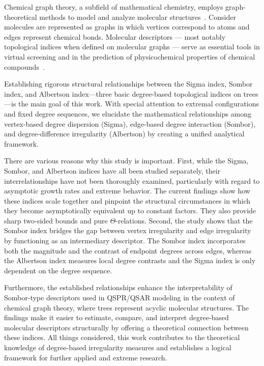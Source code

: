 \documentclass[12pt, a4paper]{article}
\begin{document}
Chemical graph theory, a subfield of mathematical chemistry, employs graph-theoretical methods to model and analyze molecular structures~\cite{Dac2026KCV}. Consider molecules are represented as graphs in which vertices correspond to atoms and edges represent chemical bonds.  Molecular descriptors --- most notably topological indices when defined on molecular graphs --- serve as essential tools in virtual screening and in the prediction of physicochemical properties of chemical compounds~\cite{Basak2024,Desmecht2024}.


Establishing rigorous structural relationships between the Sigma index, Sombor index, and Albertson index—three basic degree-based topological indices on trees—is the main goal of this work. With special attention to extremal configurations and fixed degree sequences, we elucidate the mathematical relationships among vertex-based degree dispersion (Sigma), edge-based degree interaction (Sombor), and degree-difference irregularity (Albertson) by creating a unified analytical framework.

There are various reasons why this study is important. First, while the Sigma, Sombor, and Albertson indices have all been studied separately, their interrelationships have not been thoroughly examined, particularly with regard to asymptotic growth rates and extreme behavior. The current findings show how these indices scale together and pinpoint the structural circumstances in which they become asymptotically equivalent up to constant factors. They also provide sharp two-sided bounds and pure $\Theta$-relations.
Second, the study shows that the Sombor index bridges the gap between vertex irregularity and edge irregularity by functioning as an intermediary descriptor. The Sombor index incorporates both the magnitude and the contrast of endpoint degrees across edges, whereas the Albertson index measures local degree contrasts and the Sigma index is only dependent on the degree sequence. 

Furthermore, the established relationships enhance the interpretability of Sombor-type descriptors used in QSPR/QSAR modeling in the context of chemical graph theory, where trees represent acyclic molecular structures. The findings make it easier to estimate, compare, and interpret degree-based molecular descriptors structurally by offering a theoretical connection between these indices. All things considered, this work contributes to the theoretical knowledge of degree-based irregularity measures and establishes a logical framework for further applied and extreme research.
\end{document}
